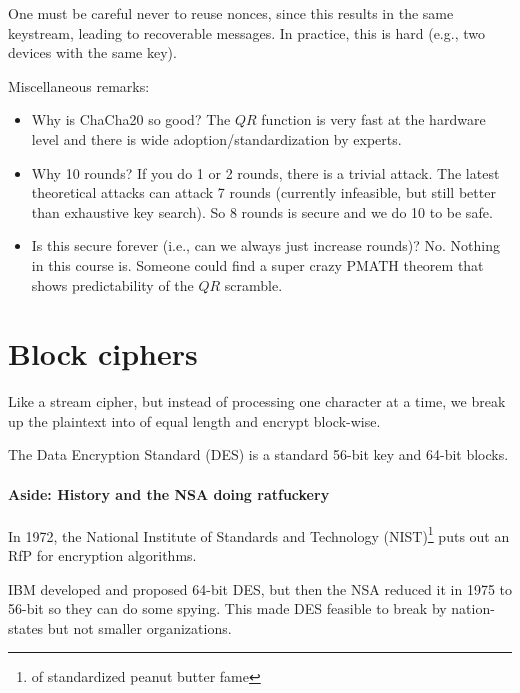\documentclass[class=co487,tikz,notes]{agony}
\begin{document}
One must be careful never to reuse nonces, since this results in the same keystream,
leading to recoverable messages.
In practice, this is hard (e.g., two devices with the same key).

Miscellaneous remarks:
\begin{itemize}[nosep]
  \item Why is ChaCha20 so good? The $QR$ function is very fast at the hardware level
        and there is wide adoption/standardization by experts.
  \item Why 10 rounds? If you do 1 or 2 rounds, there is a trivial attack.
        The latest theoretical attacks can attack 7 rounds
        (currently infeasible, but still better than exhaustive key search).
        So 8 rounds is secure and we do 10 to be safe.
  \item Is this secure forever (i.e., can we always just increase rounds)?
        No. Nothing in this course is.
        Someone could find a super crazy PMATH theorem that shows
        predictability of the $QR$ scramble.
\end{itemize}

\section{Block ciphers}

\begin{defn}
  Like a stream cipher, but instead of processing one character at a time,
  we break up the plaintext into  of equal length
  and encrypt block-wise.
\end{defn}

\begin{example}
  The Data Encryption Standard (DES) is a standard
  56-bit key and 64-bit blocks.
\end{example}

\paragraph{Aside: History and the NSA doing ratfuckery}
In 1972, the National Institute of Standards and Technology (NIST)\footnote{of standardized peanut butter fame}
puts out an RfP for encryption algorithms.

IBM developed and proposed 64-bit DES, but then the NSA reduced it in 1975
to 56-bit so they can do some spying.
This made DES feasible to break by nation-states but not smaller organizations.
\end{document}

